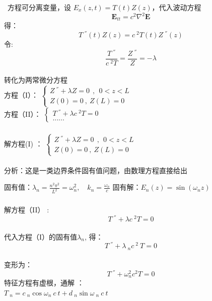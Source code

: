 \begin{frame}
      \frametitle{} 
      \解  方程可分离变量，设 $\displaystyle  E_x(z,t)=T(t)Z(z) $，代入波动方程 
      \[\mathbf{E}_{tt} =c^2\nabla^2 \mathbf{E}\]
    得：
	\begin{equation*}
		 T~^{''}(t)Z(z) =c~^2 T(t)Z~^{''}(z) 
	\end{equation*}
	令: {\hspace*{2em}}
      $$ \dfrac{T~^{''}}{c~^2 T}=\dfrac{Z~^{''} }{Z} =-\lambda $$ \\ \vspace{0.3cm}
    转化为两常微分方程 \\ \vspace{0.3cm}
    方程（I）：
      $\displaystyle  \begin{cases}
          Z~^{''} +\lambda Z=0  ~~,~~ 0<z<L\\
          Z(0)=0 ~,~Z(L)=0
      \end{cases}$ \\	
    方程（II）：
      $\displaystyle  \begin{cases}
          T~^{''} +\lambda {c~^2 T}=0 \\
          ......
      \end{cases}$ \\	  
\end{frame}

\begin{frame}
      \frametitle{}
    解方程(I) ：
    $\displaystyle  \begin{cases}
        Z~^{''} +\lambda Z=0  ~~,~~ 0<z<L\\
        Z(0)=0 ~,~Z(L)=0
    \end{cases}$ \\
    ~~~\\
    分析：这是一类边界条件固有值问题，由数理方程直接给出 
    \begin{enumerate}
    \IItem 固有值：$\displaystyle  \lambda_n=\frac{n^2\pi^2}{L^2}= \omega^2 _n, \quad k_n=\frac{\omega_n}{c} $ 
    \IItem 固有解：$\displaystyle  E_n(z)=\sin (\omega_n z) $
    \end{enumerate}
\end{frame}

\begin{frame}
    \frametitle{} 
    解方程（II） : 	\[ T~^{''} +\lambda {c~^2 T}=0 \] \\ 
	代入方程（I）的固有值$\lambda_n$, 得：
	$$ T~^{''} +\lambda~_n c~^2 ~T=0 $$ \\
	变形为：\[  T~^{''} +\omega_n ^2 {c^2 T}=0 \]
	特征方程有虚根，通解 ：\\
	\hspace{3cm}	$\displaystyle 	T~_n=c~_n\cos \omega_n~c~t+ d~_n\sin \omega ~_n~c~t $  \\ \vspace{1em}
\end{frame}

